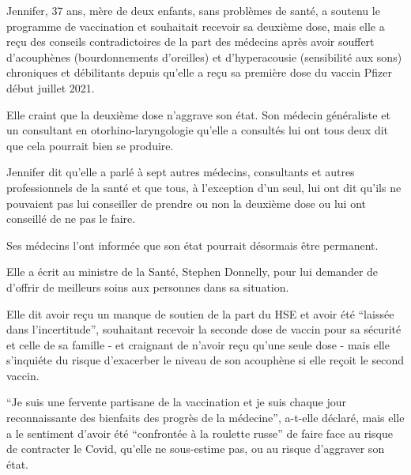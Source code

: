 Jennifer, 37 ans, mère de deux enfants, sans problèmes de santé, a soutenu le
programme de vaccination et souhaitait recevoir sa deuxième dose, mais elle a
reçu des conseils contradictoires de la part des médecins après avoir souffert
d'acouphènes (bourdonnements d'oreilles) et d'hyperacousie (sensibilité aux
sons) chroniques et débilitants depuis qu'elle a reçu sa première dose du vaccin
Pfizer début juillet 2021.

Elle craint que la deuxième dose n'aggrave son état. Son médecin généraliste et
un consultant en otorhino-laryngologie qu'elle a consultés lui ont tous deux dit
que cela pourrait bien se produire.

Jennifer dit qu'elle a parlé à sept autres médecins, consultants et autres
professionnels de la santé et que tous, à l'exception d'un seul, lui ont dit
qu'ils ne pouvaient pas lui conseiller de prendre ou non la deuxième dose ou lui
ont conseillé de ne pas le faire.

Ses médecins l'ont informée que son état pourrait désormais être permanent.

Elle a écrit au ministre de la Santé, Stephen Donnelly, pour lui demander de
d'offrir de meilleurs soins aux personnes dans sa situation.

Elle dit avoir reçu un manque de soutien de la part du HSE et avoir été “laissée
dans l'incertitude”, souhaitant recevoir la seconde dose de vaccin pour sa
sécurité et celle de sa famille - et craignant de n'avoir reçu qu'une seule dose
- mais elle s'inquiéte du risque d'exacerber le niveau de son acouphène si elle
reçoit le second vaccin.

“Je suis une fervente partisane de la vaccination et je suis chaque jour
reconnaissante des bienfaits des progrès de la médecine”, a-t-elle déclaré, mais
elle a le sentiment d'avoir été “confrontée à la roulette russe” de faire face
au risque de contracter le Covid, qu'elle ne sous-estime pas, ou au risque
d'aggraver son état.

